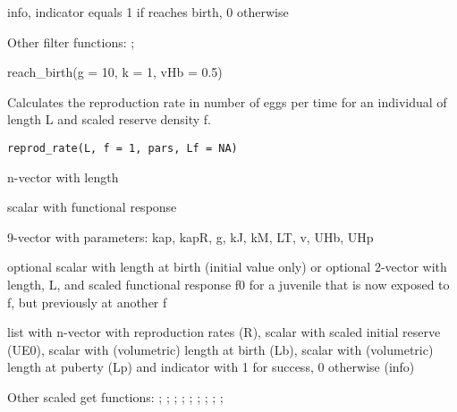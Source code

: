 \documentclass[a4paper]{book}
\begin{document}
%
\begin{Value}
info, indicator equals 1 if reaches birth, 0 otherwise
\end{Value}
%
\begin{SeeAlso}\relax
Other filter functions: ;
\end{SeeAlso}
%
\begin{Examples}
\begin{ExampleCode}
reach_birth(g = 10, k = 1, vHb = 0.5)
\end{ExampleCode}
\end{Examples}
%
\begin{Description}\relax
Calculates the reproduction rate in number of eggs per time for an individual of length L
and scaled reserve density f.
\end{Description}
%
\begin{Usage}
\begin{verbatim}
reprod_rate(L, f = 1, pars, Lf = NA)
\end{verbatim}
\end{Usage}
%
\begin{Arguments}
\begin{ldescription}
\item[\code{L}] n-vector with length

\item[\code{f}] scalar with functional response

\item[\code{pars}] 9-vector with parameters: kap, kapR, g, kJ, kM, LT, v, UHb, UHp

\item[\code{Lf}] optional scalar with length at birth (initial value only)
or optional 2-vector with length, L, and scaled functional response f0
for a juvenile that is now exposed to f, but previously at another f
\end{ldescription}
\end{Arguments}
%
\begin{Value}
list with n-vector with reproduction rates (R), scalar with scaled initial reserve (UE0),
scalar with (volumetric) length at birth (Lb), scalar with (volumetric) length at puberty (Lp) and
indicator with 1 for success, 0 otherwise (info)
\end{Value}
%
\begin{SeeAlso}\relax
Other scaled get functions: ;
; ;
; ;
; ;
; ;
\end{SeeAlso}
\end{document}

